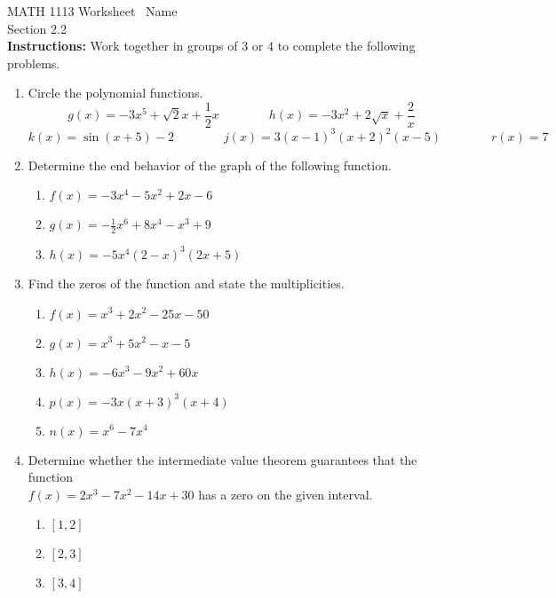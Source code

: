 \documentclass[11pt]{article}
\begin{document}
\noindent MATH 1113   \quad\quad\quad\quad\quad Worksheet \quad\quad\quad\quad\quad\   Name \underline{\phantom{alphabetsoupismyveryveryfavorite}}\\ 
\noindent Section 2.2 \\




\noindent \textbf{Instructions:}  Work together in groups of  3 or 4 to complete the following problems.\\

\begin{enumerate}



\item Circle the polynomial functions.
$$g(x)=-3x^5+\sqrt{2}x+\frac{1}{2}x \quad \quad \quad \quad h(x)=-3x^2+2\sqrt{x}+\frac{2}{x}$$ 
\vfill
$$k(x)=\sin(x+5)-2 \quad \quad \quad \quad j(x)=3(x-1)^3(x+2)^2(x-5) \quad \quad \quad \quad r(x)=7$$
\vfill
\item Determine the end behavior of the graph of the following function.
\begin{enumerate}
\item $f(x)=-3x^4-5x^2+2x-6$
\vfill
\vfill
\item $g(x)=-\frac{1}{2}x^6+8x^4-x^3+9$
\vfill
\vfill
\item $h(x)=-5x^4(2-x)^3(2x+5)$
\vfill
\vfill
\end{enumerate}

\newpage


\item Find the zeros of the function and state the multiplicities.

\begin{enumerate}

\item $f(x)=x^3+2x^2-25x-50$
\vfill
\item $g(x)=x^3+5x^2-x-5$
\vfill



\item $h(x)=-6x^3-9x^2+60x$

\vfill

\newpage
\item $p(x)=-3x(x+3)^3(x+4)$

\vfill
\vfill

\item $n(x)=x^6-7x^4$
\vfill
\vfill
\end{enumerate}

\item Determine whether the intermediate value theorem guarantees that the function \\$f(x)=2x^3-7x^2-14x+30$ has a zero on the given interval.
\begin{enumerate}
\item $[1,2]$
\vfill
\item $[2,3]$
\vfill
\item $[3,4]$
\vfill
\end{enumerate}


\end{enumerate}
\end{document}
